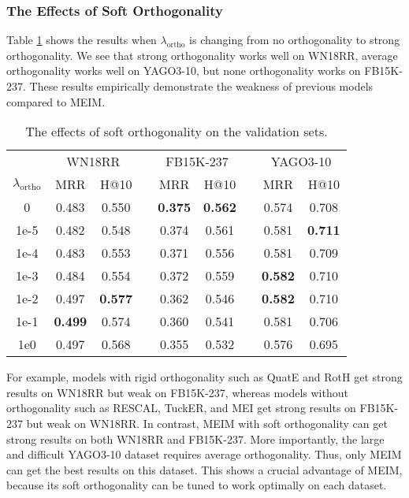 \documentclass{article}
\theoremstyle{plain}
\theoremstyle{remark}
\begin{document}
\subsubsection{The Effects of Soft Orthogonality}
Table \ref{tab:ablation_ortho} shows the results when $ \lambda_{\text{ortho}} $ is changing from no orthogonality to strong orthogonality. We see that strong orthogonality works well on WN18RR, average orthogonality works well on YAGO3-10, but none orthogonality works on FB15K-237. These results empirically demonstrate the weakness of previous models compared to MEIM. 

\begin{table}[t]
	\centering  
	\begin{adjustbox}{max width=\linewidth}
		\begin{tabular}{@{\extracolsep{-2pt}}ccclcclcc}


			& \multicolumn{2}{c}{WN18RR} && \multicolumn{2}{c}{FB15K-237} && \multicolumn{2}{c}{YAGO3-10} \\
			\cmidrule{2-3} \cmidrule{5-6} \cmidrule{8-9}
			$ \lambda_{\text{ortho}} $ & MRR & H@10 && MRR & H@10 && MRR & H@10 \\
\cmidrule{1-3} \cmidrule{5-6} \cmidrule{8-9}
			
			0 & 0.483 & 0.550 && \textbf{0.375} & \textbf{0.562} && 0.574 & 0.708 \\ 1e-5 & 0.482 & 0.548 && 0.374 & 0.561 && 0.581 & \textbf{0.711} \\ 1e-4 & 0.483 & 0.553 && 0.371 & 0.556 && 0.581 & 0.709 \\ 1e-3 & 0.484 & 0.554 && 0.372 & 0.559 && \textbf{0.582} & 0.710 \\ 1e-2 & 0.497 & \textbf{0.577} && 0.362 & 0.546 && \textbf{0.582} & 0.710 \\ 1e-1 & \textbf{0.499} & 0.574 && 0.360 & 0.541 && 0.581 & 0.706 \\ 1e0 & 0.497 & 0.568 && 0.355 & 0.532 && 0.576 & 0.695 \\ 

\end{tabular}
	\end{adjustbox}
	\caption[]{The effects of soft orthogonality on the validation sets.}
	\label{tab:ablation_ortho}
\end{table}

For example, models with rigid orthogonality such as QuatE and RotH get strong results on WN18RR but weak on FB15K-237, whereas models without orthogonality such as RESCAL, TuckER, and MEI get strong results on FB15K-237 but weak on WN18RR. In contrast, MEIM with soft orthogonality can get strong results on both WN18RR and FB15K-237. More importantly, the large and difficult YAGO3-10 dataset requires average orthogonality. Thus, only MEIM can get the best results on this dataset. This shows a crucial advantage of MEIM, because its soft orthogonality can be tuned to work optimally on each dataset.
\end{document}
